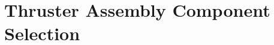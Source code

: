 \documentclass[../main.tex]{subfiles}
\begin{document}
\section{Thruster Assembly Component Selection} \label{batterySelect}
\end{document}
